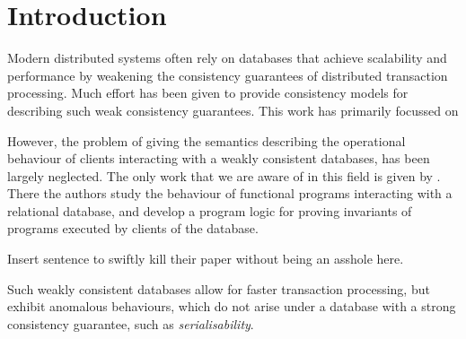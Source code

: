\section{Introduction}





Modern distributed systems often rely on databases that achieve
scalability and performance by weakening the consistency guarantees of
distributed transaction processing. Much effort has been given to 
provide  consistency models for describing  such weak consistency
guarantees\cite{...nowwhatshouldthecitationsbeev_transactions,framework-concur,consistency3d,seebelieve,laws,alonetogether}. 
This work has primarily focussed on 




However, the problem of giving the semantics describing the operational behaviour of 
clients interacting with a weakly consistent databases, has been largely neglected. The only 
work that we are aware of in this field is given by \cite{alonetogether}. There the authors 
study the behaviour of functional programs interacting with a relational database, and develop 
a program logic for proving invariants of programs executed by clients
of the database. 




\ac{Insert sentence to swiftly kill their paper without being an asshole here.}




 Such weakly consistent databases allow for faster
transaction processing, but exhibit anomalous behaviours, which do not arise under a database
with a strong consistency guarantee, such as \emph{serialisability}. 



